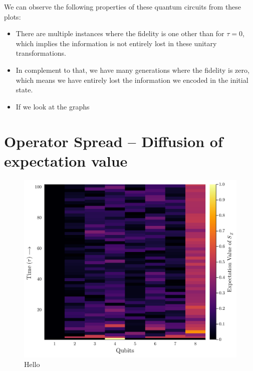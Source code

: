 \documentclass[11pt, oneside, listof=totoc]{scrbook}
\begin{document}
We can observe the following properties of these quantum circuits from these plots:
\begin{itemize}
    \item There are multiple instances where the fidelity is one other than for \(\tau = 0\), which implies the information is not entirely lost in these unitary transformations.

    \item In complement to that, we have many generations where the fidelity is zero, which means we have entirely lost the information we encoded in the initial state.

    \item If we look at the graphs
\end{itemize}


\section{Operator Spread -- Diffusion of expectation value}

\begin{figure}[H]
    \centering
    \includegraphics[width=\textwidth]{spread-Sz.png}
    \caption{Hello}
    \label{fig:spread}
\end{figure} \noindent


\end{document}
